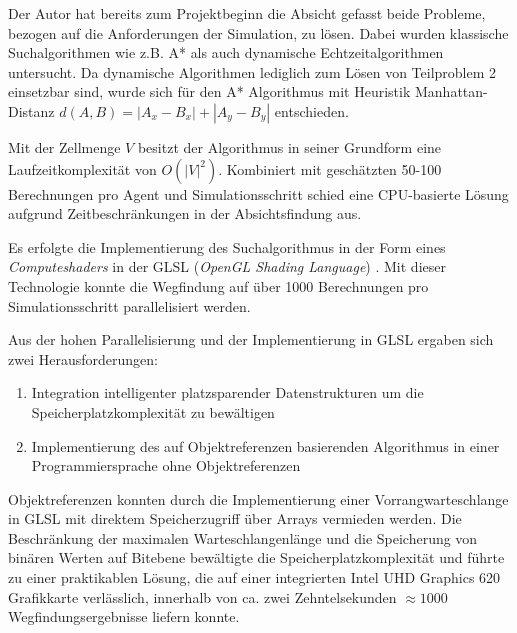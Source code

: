 \documentclass[runningheads]{llncs}
\begin{document}
	Der Autor hat bereits zum Projektbeginn die Absicht gefasst beide Probleme, bezogen auf die Anforderungen der Simulation, zu lösen. Dabei wurden klassische Suchalgorithmen wie z.B. A* \cite{Hart1968} als auch dynamische Echtzeitalgorithmen \cite[182-191]{Weiss2000} untersucht. Da dynamische Algorithmen lediglich zum Lösen von Teilproblem 2 einsetzbar sind, wurde sich für den A* Algorithmus mit Heuristik Manhattan-Distanz $d(A, B) = | A_{x} - B_{x} | + | A_{y} - B_{y} |$ entschieden.
	
	Mit der Zellmenge $V$ besitzt der Algorithmus in seiner Grundform eine Laufzeitkomplexität von $O(|V|^{2})$. Kombiniert mit geschätzten 50-100 Berechnungen pro Agent und Simulationsschritt schied eine CPU-basierte Lösung aufgrund Zeitbeschränkungen in der Absichtsfindung aus.
	
	Es erfolgte die Implementierung des Suchalgorithmus in der Form eines \textit{Computeshaders} in der GLSL (\textit{OpenGL Shading Language}) \cite{GLSL}. Mit dieser Technologie konnte die Wegfindung auf über 1000 Berechnungen pro Simulationsschritt parallelisiert werden.
	
	Aus der hohen Parallelisierung und der Implementierung in GLSL ergaben sich zwei Herausforderungen:
	\begin{enumerate}
		\item Integration intelligenter platzsparender Datenstrukturen um die Speicherplatzkomplexität zu bewältigen
		\item Implementierung des auf Objektreferenzen basierenden Algorithmus in einer Programmiersprache ohne Objektreferenzen
	\end{enumerate}
	
	Objektreferenzen konnten durch die Implementierung einer Vorrangwarteschlange in GLSL mit direktem Speicherzugriff über Arrays vermieden werden. Die Beschränkung der maximalen Warteschlangenlänge und die Speicherung von binären Werten auf Bitebene bewältigte die Speicherplatzkomplexität und führte zu einer praktikablen Lösung, die auf einer integrierten Intel UHD Graphics 620 Grafikkarte verlässlich, innerhalb von ca. zwei Zehntelsekunden $ \approx 1000$ Wegfindungsergebnisse liefern konnte.
	
\end{document}
